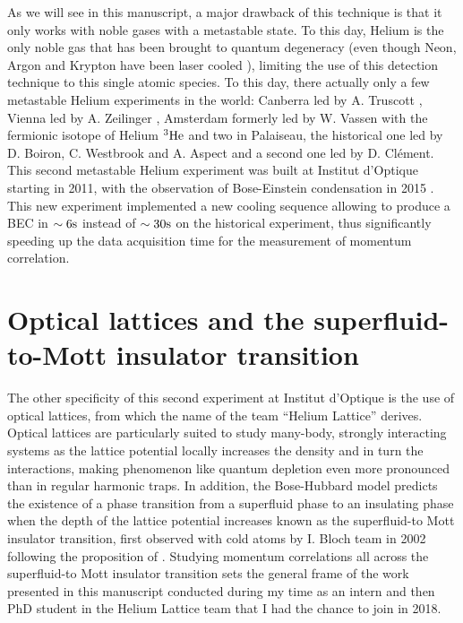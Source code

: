 As we will see in this manuscript, a major drawback of this technique is that it only works with noble gases with a metastable state. To this day, Helium is the only noble gas that has been brought to quantum degeneracy (even though Neon, Argon and Krypton have been laser cooled \cite{shimizu1989laser,katori1990laser}), limiting the use of this detection technique to this single atomic species. To this day, there actually only a few metastable Helium experiments in the world: Canberra led by A. Truscott \cite{abbas2021rapid}, Vienna led by A. Zeilinger \cite{keller2014bose}, Amsterdam formerly led by W. Vassen \cite{mcnamara2006degenerate} with the fermionic isotope of Helium $^3 \rm{He}$ and two in Palaiseau, the historical one led by D. Boiron, C. Westbrook and A. Aspect and a second one led by D. Clément. This second metastable Helium experiment was built at Institut d'Optique starting in 2011, with the observation of Bose-Einstein condensation in 2015 \cite{bouton2015fast}. This new experiment implemented a new cooling sequence allowing to produce a BEC in $\sim 6\rm{s}$ instead of $\sim 30\rm{s}$ on the historical experiment, thus significantly speeding up the data acquisition time for the measurement of momentum correlation.

\section*{Optical lattices and the superfluid-to-Mott insulator transition}

The other specificity of this second experiment at Institut d'Optique is the use of optical lattices, from which the name of the team ``Helium Lattice'' derives. Optical lattices are particularly suited to study many-body, strongly interacting systems as the lattice potential locally increases the density and in turn the interactions, making phenomenon like quantum depletion even more pronounced than in regular harmonic traps. In addition, the Bose-Hubbard model predicts the existence of a phase transition from a superfluid phase to an insulating phase when the depth of the lattice potential increases known as the superfluid-to Mott insulator transition, first observed with cold atoms by I. Bloch team in 2002 \cite{greiner2002quantum} following the proposition of \cite{jaksch1998cold}. Studying momentum correlations all across the superfluid-to Mott insulator transition sets the general frame of the work presented in this manuscript conducted during my time as an intern and then PhD student in the Helium Lattice team that I had the chance to join in 2018.

